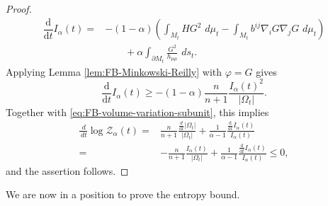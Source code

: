 \documentclass[11pt, reqno]{amsart}
\theoremstyle{remark}
\theoremstyle{definition}
\numberwithin{equation}{section}
\newcommand{\dd}{\,d}
\begin{document}
\begin{proof}
	\begin{align*}
		\dfrac{\mathrm{d}}{\mathrm{d}t}I_\alpha(t)
		=&-(1-\alpha)\left(
		\int_{M_t}H G^2\,\dd \mu_t
		-\int_{M_t}b^{ij}\nabla_i G\nabla_j G\,\dd \mu_t\right)\\
		&\qquad +\alpha\int_{\partial M_t}\frac{G^2}{h_{\mu\mu}}\,\dd s_t.
	\end{align*}
	Applying Lemma \ref{lem:FB-Minkowski-Reilly} with $\varphi=G$ gives
	\begin{equation*}
		\dfrac{\mathrm{d}}{\mathrm{d}t}I_\alpha(t)
		\ge -(1-\alpha)\frac n{n+1}\frac{I_\alpha(t)^2}{|\Omega_t|}.
	\end{equation*}
	Together with \eqref{eq:FB-volume-variation-subunit}, this implies
	\begin{align*}
		\frac{\dd}{\dd t}\log\mathcal Z_\alpha(t)
		=& \frac n{n+1}\frac{\frac{d}{\mathrm{d}t}|\Omega_t|}{|\Omega_t|}
		+\frac1{\alpha-1}\frac{\frac{\mathrm{d}}{\mathrm{d}t}I_{\alpha}(t)}{I_\alpha(t)} \\
		=&-\frac n{n+1}\frac{I_\alpha(t)}{|\Omega_t|}
		+\frac1{\alpha-1}\frac{\frac{\mathrm{d}}{\mathrm{d}t}I_\alpha(t)}{I_\alpha(t)} \leq 0,
	\end{align*}
	and the assertion follows.
\end{proof}

We are now in a position to prove the entropy bound.
\end{document}
